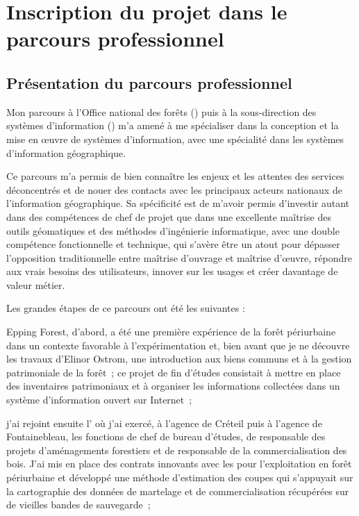 \section[origin]
{Inscription du projet dans le parcours professionnel}

\subsection
{Présentation du parcours professionnel}

Mon parcours à l'Office national des forêts ({\ONF})
puis à la sous-direction des systèmes d'information ({\SDSI})
m'a amené à me spécialiser dans la conception et la mise en œuvre
de systèmes d'information, avec une spécialité dans les systèmes d'information géographique.

Ce parcours m'a permis de bien connaître les enjeux et les attentes
des services déconcentrés et de nouer des contacts avec les principaux
acteurs nationaux de l'information géographique.
Sa spécificité est de m'avoir permis d'investir autant dans
des compétences de chef de projet que dans une excellente maîtrise
des outils géomatiques et des méthodes d'ingénierie informatique,
avec une double compétence fonctionnelle et technique,
qui s'avère être un atout pour dépasser l'opposition traditionnelle
entre maîtrise d'ouvrage et maîtrise d’œuvre,
répondre aux vrais besoins des utilisateurs, innover sur les usages
et créer davantage de valeur métier.

Les grandes étapes de ce parcours ont été les suivantes :

\startitemize[n]

\item Epping Forest, d'abord,
      a été une première expérience de la forêt
      périurbaine dans un contexte favorable à l'expérimentation
      et, bien avant que je ne découvre les travaux d'Elinor Ostrom,
      une introduction aux biens communs et à la gestion patrimoniale de la forêt~;
      ce projet de fin d'études consistait à mettre en place des inventaires patrimoniaux
      et à organiser les informations collectées dans un système d'information
      ouvert sur Internet~;

\item j'ai rejoint ensuite l'{\ONF}
      où j'ai exercé, à l'agence de Créteil puis à l'agence de Fontainebleau,
      les fonctions de chef de bureau d'études, de responsable
      des projets d'aménagements forestiers et de responsable
      de la commercialisation des bois. J'ai mis en place
      des contrats innovants avec les {\ETF} pour l'exploitation
      en forêt périurbaine et développé une méthode d'estimation
      des coupes qui s'appuyait sur la cartographie
      des données de martelage et de commercialisation
      récupérées sur de vieilles bandes de sauvegarde~;


